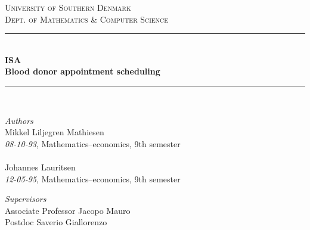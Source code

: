 \documentclass[a4paper,12pt]{article}
\begin{document}
	\begin{titlepage} %
		\newcommand{\HRule}{\rule{\linewidth}{0.5mm}} %
		
		\center %
		
		
		\textsc{\LARGE University of Southern Denmark}\\[0.5cm] %
		
		\textsc{\Large Dept. of Mathematics \& Computer Science
         }\\[0.5cm] %
		
		
		\HRule\\[0.2cm]
		
		{\huge\bfseries ISA \\ [0.4cm] Blood donor appointment scheduling
		}\\[0.4cm] %
		
		\HRule\\[2 cm]
		
		
	
		\begin{flushleft}
			\large
			\textit{Authors}\\
			Mikkel Liljegren Mathiesen\\
			\textit{08-10-93}, Mathematics–economics, 9th semester\\
			\ \\
			Johannes Lauritsen\\
			\textit{12-05-95}, Mathematics–economics, 9th semester
		\end{flushleft}
		
		\begin{flushleft}
			\large
			\textit{Supervisors}\\
			Associate Professor Jacopo Mauro\\
			Postdoc Saverio Giallorenzo
			

		\end{flushleft}


\end{titlepage}
\end{document}
